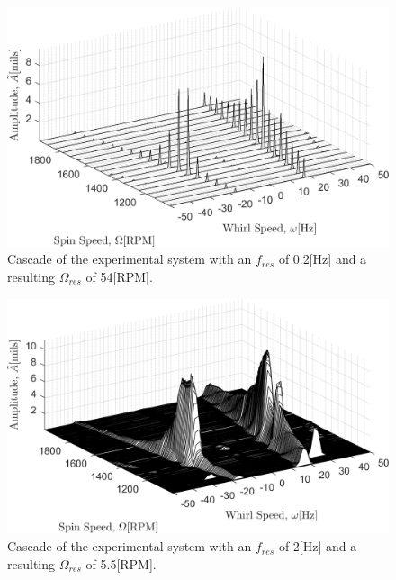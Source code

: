 \begin{figure}
	\centering
	\includegraphics[]{./figures/ExpExampleCascadeLowFres.png}
	\caption{Cascade of the experimental system with an $ f_{res} $ of 0.2[Hz] and a resulting $ \Omega_{res} $ of 54[RPM].}
	\label{fig:ExpExampleCascadeLowFres}
\end{figure}
\begin{figure}
	\centering
	\includegraphics[]{./figures/ExpExampleCascadeHighFres.png}
	\caption{Cascade of the experimental system with an $ f_{res} $ of 2[Hz] and a resulting $ \Omega_{res} $ of 5.5[RPM].}
	\label{fig:ExpExampleCascadeHighFres}
\end{figure}